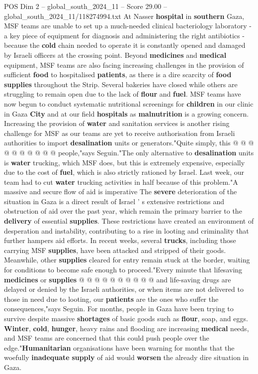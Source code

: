 \begin{textsample}{POS Dim 2 – global\_south\_2024\_11 – Score 29.00 – global\_south\_2024\_11/118274994.txt}
At Nasser \textbf{hospital} in \textbf{southern} Gaza, MSF teams are unable to set up a much-needed clinical bacteriology laboratory - a key piece of equipment for diagnosis and administering the right antibiotics - because the \textbf{cold} chain needed to operate it is constantly opened and damaged by Israeli officers at the crossing point.
Beyond \textbf{medicines} and \textbf{medical} equipment, MSF teams are also facing increasing challenges in the provision of sufficient \textbf{food} to hospitalised \textbf{patients}, as there is a dire scarcity of \textbf{food} \textbf{supplies} throughout the Strip.
Several bakeries have closed while others are struggling to remain open due to the lack of \textbf{flour} and \textbf{fuel}.
MSF teams have now begun to conduct systematic nutritional screenings for \textbf{children} in our clinic in Gaza \textbf{City} and at our field \textbf{hospitals} as \textbf{malnutrition} is a growing concern.
Increasing the provision of \textbf{water} and sanitation services is another rising challenge for MSF as our teams are yet to receive authorisation from Israeli authorities to import \textbf{desalination} units or generators."Quite simply, this @ @ @ @ @ @ @ @ @ @ people,"says Seguin."The only alternative to \textbf{desalination} units is \textbf{water} trucking, which MSF does, but this is extremely expensive, especially due to the cost of \textbf{fuel}, which is also strictly rationed by Israel.
Last week, our team had to cut \textbf{water} trucking activities in half because of this problem."A massive and secure flow of aid is imperative The \textbf{severe} deterioration of the situation in Gaza is a direct result of Israel ' s extensive restrictions and obstruction of aid over the past year, which remain the primary barrier to the \textbf{delivery} of essential \textbf{supplies}.
These restrictions have created an environment of desperation and instability, contributing to a rise in looting and criminality that further hampers aid efforts.
In recent weeks, several \textbf{trucks}, including those carrying MSF \textbf{supplies}, have been attacked and stripped of their goods.
Meanwhile, other \textbf{supplies} cleared for entry remain stuck at the border, waiting for conditions to become safe enough to proceed."Every minute that lifesaving \textbf{medicines} or \textbf{supplies} @ @ @ @ @ @ @ @ @ @ and life-saving drugs are delayed or denied by the Israeli authorities, or when items are not delivered to those in need due to looting, our \textbf{patients} are the ones who suffer the consequences,"says Seguin.
For months, people in Gaza have been trying to survive despite massive \textbf{shortages} of basic goods such as \textbf{flour}, soap, and eggs. \textbf{Winter}, \textbf{cold}, \textbf{hunger}, heavy rains and flooding are increasing \textbf{medical} needs, and MSF teams are concerned that this could push people over the edge."\textbf{Humanitarian} organisations have been warning for months that the woefully \textbf{inadequate} \textbf{supply} of aid would \textbf{worsen} the already dire situation in Gaza.

\end{textsample}
